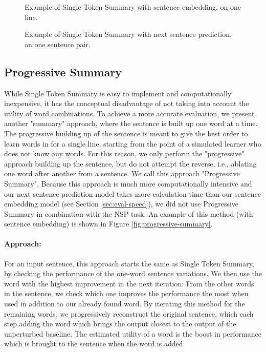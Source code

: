\begin{figure}[H]
	
	\caption{Example of Single Token Summary with sentence embedding, on one line.}
	\label{fig:single-token-summary-sentemb}
\end{figure}

\begin{figure}[H]
	
	\caption{Example of Single Token Summary with next sentence prediction, on one sentence pair.}
	\label{fig:single-token-summary-nsp}
\end{figure}


\subsection{Progressive Summary} \label{sec:progressive-summary}
While Single Token Summary is easy to implement and computationally inexpensive, it has the conceptual disadvantage of not taking into account the utility of word combinations.
To achieve a more accurate evaluation, we present another "summary" approach, where the sentence is built up one word at a time.
The progressive building up of the sentence is meant to give the best order to learn words in for a single line, starting from the point of a simulated learner who does not know any words.
For this reason, we only perform the "progressive" approach building up the sentence, but do not attempt the reverse, i.e., ablating one word after another from a sentence.
We call this approach "Progressive Summary".
Because this approach is much more computationally intensive and our next sentence prediction model takes more calculation time than our sentence embedding model (see Section \ref{sec:eval-speed}), we did not use Progressive Summary in combination with the NSP task.
An example of this method (with sentence embedding) is shown in Figure \ref{fig:progressive-summary}.

\paragraph{Approach:}
For an input sentence, this approach starts the same as Single Token Summary, by checking the performance of the one-word sentence variations.
We then use the word with the highest improvement in the next iteration:
From the other words in the sentence, we check which one improves the performance the most when used in addition to our already found word.
By iterating this method for the remaining words, we progressively reconstruct the original sentence, which each step adding the word which brings the output closest to the output of the unperturbed baseline.
The estimated utility of a word is the boost in performance which is brought to the sentence when the word is added.

